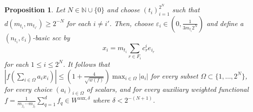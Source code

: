 \documentclass[12pt,a4paper]{amsart}
\newcommand{\N}{\mathbb{N}}
\newcommand{\bes}{\begin{equation*}}
\newcommand{\ees}{\end{equation*}}
\newcommand{\ep}{\varepsilon}
\theoremstyle{definition}
\theoremstyle{plain}
\newtheorem{proposition}[question]{Proposition}
\begin{document}
\begin{proposition}{\label{c0_type_estimate}}
Let $N\in\N\cup\{0\}$ and choose $(t_{i})_{i=1}^{2^{N}}$ such that $d(m_{t_{i}},m_{t_{i'}})\geq 2^{-N}$ for each $i\neq i'$. Then, choose $\ep_{i}\in\left(0,\frac{1}{3m_{t_{i}}2^{N}}\right)$ and define a $(n_{t_{i}},\ep_{i})$-basic scc by
\bes x_{i}=m_{t_{i}}\sum_{r\in F_{i}}c_{r}^{i}e_{i_{r}} \ees
for each $1\leq i\leq 2^{N}$. It follows that $\left\vert f\left(\sum_{i\in\Omega}a_{i}x_{i}\right)\right\vert\leq \left(1+\frac{4}{\sqrt{w(f)}}\right)\max_{i\in\Omega}|a_{i}|$ for every subset $\Omega\subset\{1,\ldots,2^{N}\}$, for every choice $(a_{i})_{i\in\Omega}$ of scalars, and for every auxiliary weighted functional $f=\frac{1}{m_{j_{1}}\cdots m_{j_{l}}}\sum_{q=1}^{d}f_{q}\in W^{\text{aux},\delta}$ where $\delta<2^{-(N+1)}$.
\end{proposition}
\end{document}
